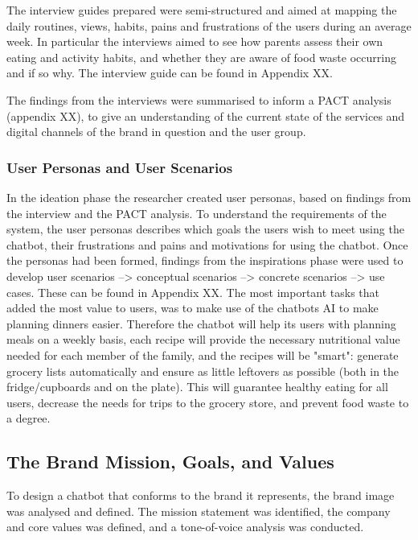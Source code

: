    The interview guides prepared were semi-structured and aimed at mapping the daily routines, views, habits, pains and frustrations of the users during an average week. In particular the interviews aimed to see how parents assess their own eating and activity habits, and whether they are aware of food waste occurring and if so why. The interview guide can be found in Appendix XX. 
   
   The findings from the interviews were summarised to inform a PACT analysis (appendix XX), to give an understanding of the current state of the services and digital channels of the brand in question and the user group.

\vspace{2,5mm} %

    \subsubsection{User Personas and User Scenarios}
    
    In the ideation phase the researcher created user personas, based on findings from the interview and the PACT analysis. To understand the requirements of the system, the user personas describes which goals the users wish to meet using the chatbot, their frustrations and pains and motivations for using the chatbot. Once the personas had been formed, findings from the inspirations phase were used to develop user scenarios --> conceptual scenarios --> concrete scenarios --> use cases. These can be found in Appendix XX. The most important tasks that added the most value to users, was to make use of the chatbots AI to make planning dinners easier. Therefore the chatbot will help its users with planning meals on a weekly basis, each recipe will provide the necessary nutritional value needed for each member of the family, and the recipes will be "smart": generate grocery lists automatically and ensure as little leftovers as possible (both in the fridge/cupboards and on the plate). This will guarantee healthy eating for all users, decrease the needs for trips to the grocery store, and prevent food waste to a degree.
    
    
\vspace{2,5mm} %

    \subsection{The Brand Mission, Goals, and Values}
    To design a chatbot that conforms to the brand it represents, the brand image was analysed and defined. The mission statement was identified, the company and core values was defined, and a tone-of-voice analysis was conducted.
    
